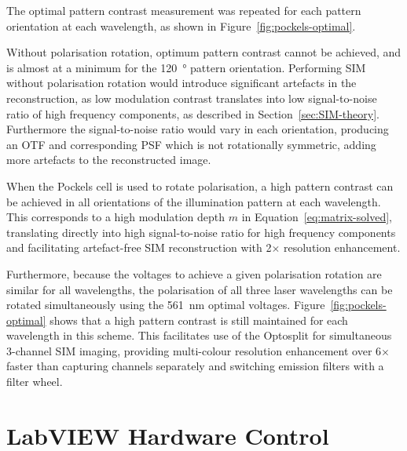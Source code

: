 The optimal pattern contrast measurement was repeated for each pattern orientation at each wavelength, as shown in Figure~\ref{fig:pockels-optimal}. 

Without polarisation rotation, optimum pattern contrast cannot be achieved, and is almost at a minimum for the \SI{120}{\degree} pattern orientation. 
Performing SIM without polarisation rotation would introduce significant artefacts in the reconstruction, as low modulation contrast translates into low signal-to-noise ratio of high frequency components, as described in Section~\ref{sec:SIM-theory}.
Furthermore the signal-to-noise ratio would vary in each orientation, producing an OTF and corresponding PSF which is not rotationally symmetric, adding more artefacts to the reconstructed image.

When the Pockels cell is used to rotate polarisation, a high pattern contrast can be achieved in all orientations of the illumination pattern at each wavelength. 
This corresponds to a high modulation depth $m$ in Equation~\ref{eq:matrix-solved}, translating directly into high signal-to-noise ratio for high frequency components and facilitating artefact-free SIM reconstruction with 2$\times$ resolution enhancement. 

Furthermore, because the voltages to achieve a given polarisation rotation are similar for all wavelengths, the polarisation of all three laser wavelengths can be rotated simultaneously using the \SI{561}{\nano\metre} optimal voltages. 
Figure~\ref{fig:pockels-optimal} shows that a high pattern contrast is still maintained for each wavelength in this scheme. 
This facilitates use of the Optosplit for simultaneous 3-channel SIM imaging, providing multi-colour resolution enhancement over 6$\times$ faster than capturing channels separately and switching emission filters with a filter wheel. 


\section{LabVIEW Hardware Control} \label{sec:labview}
